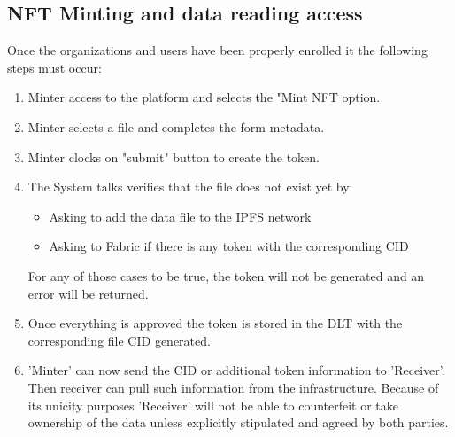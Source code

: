 \subsection{NFT Minting and data reading access}
Once the organizations and users have been properly enrolled it the following steps must occur:
\begin{enumerate}
    \item Minter access to the platform and selects the "Mint 
    \ac{NFT} option.
    \item Minter selects a file and completes the form metadata.
    \item Minter clocks on "submit" button to create the token.
    \item The System talks verifies that the file does not exist yet by:
    \begin{itemize}
        \item Asking to add the data file to the \ac{IPFS} network
        \item Asking to Fabric if there is any token with the corresponding \ac{CID}
    \end{itemize}
    For any of those cases to be true, the token will not be generated and an error will be returned.
    \item Once everything is approved the token is stored in the \ac{DLT} with the corresponding file \ac{CID} generated.
    \item 'Minter' can now send the \ac{CID} or additional token information to 'Receiver'. Then receiver can pull such information from the infrastructure. Because of its unicity purposes 'Receiver' will not be able to counterfeit or take ownership of the data unless explicitly stipulated and agreed by both parties.
\end{enumerate}

